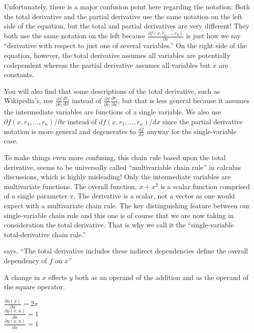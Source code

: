 \documentclass[11pt]{article}
\begin{document}
Unfortunately, there is a major confusion point here regarding the notation: Both the total derivative and the partial derivative use the same notation on the left side of the equation, but  the total and partial derivatives are very different! They both use the same notation on the left because $\frac{\partial f(x,r_1,\ldots,r_n)}{\partial x}$ is just how we say ``derivative with respect to just one of several variables.'' On the right side of the equation, however, the total derivative assumes all variables are potentially codependent whereas the partial derivative assumes all variables but $x$ are constants. 

You will also find that some descriptions of the total derivative, such as Wikipedia's, use $\frac{\partial f}{\partial r_i}\frac{d r_i}{dx}$ instead of $\frac{\partial f}{\partial r_i}\frac{\partial r_i}{\partial x}$, but that is less general because it assumes the intermediate variables are functions of a single variable. We also use ${\partial f(x,r_1,\ldots,r_n)}/{\partial x}$ instead of ${df(x,r_1,\ldots,r_n)}/{dx}$ since the partial derivative notation is more general and degenerates to $\frac{df}{dx}$ anyway for the single-variable case.

To make things even more confusing, this chain rule based upon the total derivative, seems to be universally called ``multivariable chain rule'' in calculus discussions, which is highly misleading! Only the intermediate variables are multivariate functions. The overall function, $x + x^2$ is a scalar function comprised of a single parameter $x$. The derivative is a scalar, not a vector as one would expect with a multivariate chain rule. The key distinguishing feature between our single-variable chain rule and this one is of course that we are now taking in consideration the total derivative. That is why we call it the ``single-variable total-derivative chain rule.''

  says, ``The total derivative includes these indirect dependencies define the overall dependency of $f$ on $x$'' 

A change in $x$ effects $y$ both as an operand of the addition and as the operand of the square operator. 






$\frac{\partial u(x)}{\partial u} = 2x$\\
$\frac{\partial y(x,u)}{\partial u} = 1$\\
$\frac{\partial y(x,u)}{\partial x} = 1$\\
\end{document}
